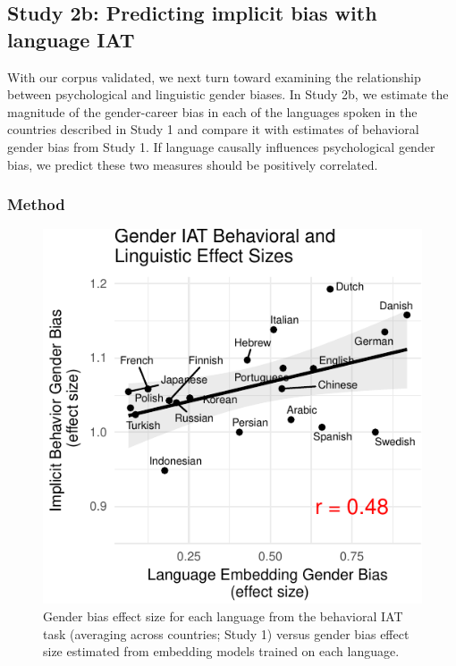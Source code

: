 \documentclass[10pt, letterpaper]{article}
\newenvironment{CodeChunk}{}{}
\begin{document}
\subsection{Study 2b: Predicting implicit bias with language
IAT}\label{study-2b-predicting-implicit-bias-with-language-iat}

With our corpus validated, we next turn toward examining the
relationship between psychological and linguistic gender biases. In
Study 2b, we estimate the magnitude of the gender-career bias in each of
the languages spoken in the countries described in Study 1 and compare
it with estimates of behavioral gender bias from Study 1. If language
causally influences psychological gender bias, we predict these two
measures should be positively correlated.

\subsubsection{Method}\label{method-2}

\begin{CodeChunk}
\begin{figure}[t]

{\centering \includegraphics{figs/behavior_vs_language_plot-1} 

}

\caption[Gender bias effect size for each language from the behavioral IAT task (averaging across countries]{Gender bias effect size for each language from the behavioral IAT task (averaging across countries; Study 1) versus gender bias effect size estimated from embedding models trained on each language.}\label{fig:behavior_vs_language_plot}
\end{figure}
\end{CodeChunk}
\end{document}
